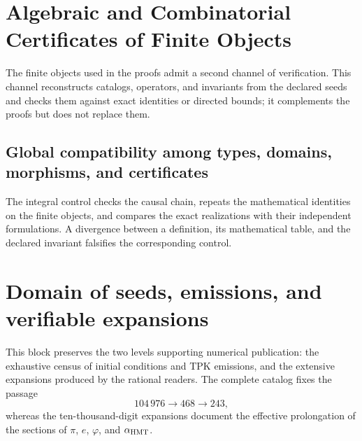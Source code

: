 
\chapter{Algebraic and Combinatorial Certificates of Finite Objects}
\label{app:infraestructura-reproducible-acumulativa}
\label{app:pruebas}

The finite objects used in the proofs admit a second channel
of verification. This channel reconstructs catalogs, operators, and invariants
from the declared seeds and checks them against exact identities or directed
bounds; it complements the proofs but does not replace them.

\HMTDemoteHeadings

\HMTRestoreHeadings

\section{Global compatibility among types, domains, morphisms, and certificates}
\label{sec:ejecucion-integral-acumulativa}

The integral control checks the causal chain, repeats the mathematical
identities on the finite objects, and compares the exact realizations with
their independent formulations. A divergence between a definition, its
mathematical table, and the declared invariant falsifies the corresponding control.





\chapter{Domain of seeds, emissions, and verifiable expansions}
\label{app:semillas-emisiones-expansiones-acumulativas}

This block preserves the two levels supporting numerical publication: the
exhaustive census of initial conditions and TPK emissions, and the extensive
expansions produced by the rational readers. The complete catalog fixes the
passage
\[
104\,976\longrightarrow468\longrightarrow243,
\]
whereas the ten-thousand-digit expansions document the effective prolongation
of the sections of \(\pi\), \(e\), \(\varphi\), and
\(\alpha_{\rm HMT}\).

